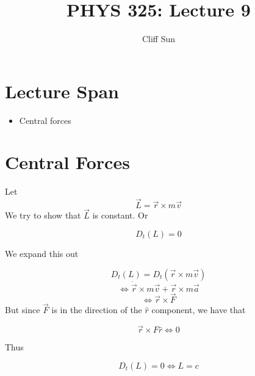 \documentclass{article}
\title{PHYS 325: Lecture 9}
\author{Cliff Sun}
\newtheorem{one minute paper}[theorem]{One Minute Paper}
\begin{document}
\maketitle

\section*{Lecture Span}
\begin{itemize}
    \item Central forces
\end{itemize}

\section*{Central Forces}

Let 
\begin{equation}
    \vec{L} = \vec{r} \times m\vec{v}
\end{equation}
We try to show that $\vec{L}$ is constant. Or 

\begin{equation}
    D_t (L) = 0
\end{equation}

We expand this out

\begin{equation}
    D_t(L) = D_t(\vec{r} \times m\vec{v})
\end{equation}
\begin{equation}
    \iff \dot{\vec{r}} \times m\vec{v} + \vec{r} \times m\vec{a}
\end{equation}
\begin{equation}
    \iff \vec{r} \times \vec{F}
\end{equation}
But since $\vec{F}$ is in the direction of the $\hat{r}$ component, we have that 

\begin{equation}
    \vec{r} \times F\hat{r} \iff 0
\end{equation}

Thus 

\begin{equation}
    D_t(L) = 0 \iff L = c 
\end{equation}
\end{document}
